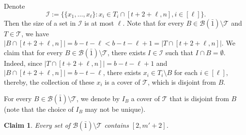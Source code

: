 \documentclass[11pt]{article}
\newcommand{\m}{\mathcal}
\newtheorem{claim}[theorem]{Claim}
\begin{document}
Denote
\[
\m I :=\{\{x_1,\dots,x_{\ell}\}:x_i\in T_i\cap [t+2+\ell, n], i\in [\ell] \}.
\]
Then the size of a set in $\m I$ is at most $\ell$.
Note that for every $B\in \m B(\bar{1})\setminus \m T$ and $T\in \m T$, we have $|B\cap [t+2+\ell,n]|=b-t-\ell<b-t-\ell+1=|T\cap  [t+2+\ell,n]|$. 
We claim that for every $B\in \m B(\bar{1})\setminus \m T$, there exists $I\in \m I$ such that $I\cap B=\emptyset$.
Indeed, since $|T\cap  [t+2+\ell,n]|=b-t-\ell+1$ and $|B\cap [t+2+\ell,n]|=b-t-\ell$, there exists $x_i\in T_i\setminus B$ for each $i\in [\ell]$, thereby, the collection of these $x_i$ is a cover of $\m T$, which is disjoint from $B$. 

For every $B\in \m B(\bar{1})\setminus \m T$, we denote by $I_B$ a cover of $\m T$ that is disjoint from $B$ (note that the choice of $I_B$ may not be unique). 

\begin{claim}\label{11-19-1}
Every set of $\mathcal{B}(\bar{1})\setminus \mathcal{T}$ contains $[2, m'+2]$.
\end{claim}
\end{document}

